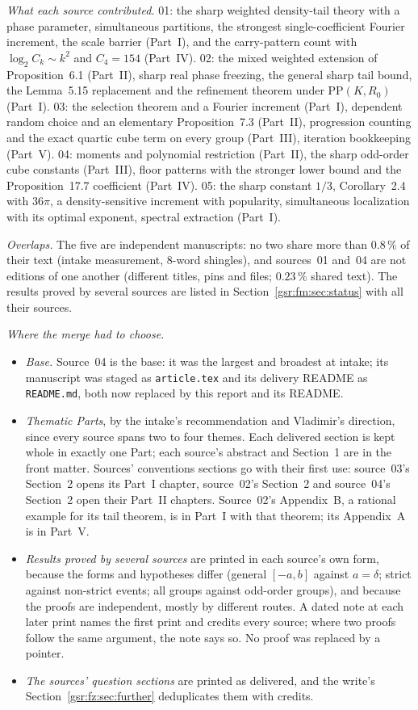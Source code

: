 \documentclass[11pt,letterpaper]{article}
\numberwithin{equation}{section}
\theoremstyle{definition}
\theoremstyle{remark}
\newcommand{\1}{\mathbf 1}
\newcommand{\file}[1]{\nolinkurl{#1}}
\begin{document}
\emph{What each source contributed.} 01: the sharp weighted density-tail theory with a phase parameter, simultaneous partitions, the strongest single-coefficient Fourier increment, the scale barrier (Part~I), and the carry-pattern count with $\log_2C_k\sim k^2$ and $C_4=154$ (Part~IV). 02: the mixed weighted extension of Proposition~6.1 (Part~II), sharp real phase freezing, the general sharp tail bound, the Lemma~5.15 replacement and the refinement theorem under $\mathrm{PP}(K,R_0)$ (Part~I). 03: the selection theorem and a Fourier increment (Part~I), dependent random choice and an elementary Proposition~7.3 (Part~II), progression counting and the exact quartic cube term on every group (Part~III), iteration bookkeeping (Part~V). 04: moments and polynomial restriction (Part~II), the sharp odd-order cube constants (Part~III), floor patterns with the stronger lower bound and the Proposition~17.7 coefficient (Part~IV). 05: the sharp constant $1/3$, Corollary~2.4 with $36\pi$, a density-sensitive increment with popularity, simultaneous localization with its optimal exponent, spectral extraction (Part~I).

\emph{Overlaps.} The five are independent manuscripts: no two share more than $0.8\,\%$ of their text (intake measurement, 8-word shingles), and sources~01 and~04 are not editions of one another (different titles, pins and files; $0.23\,\%$ shared text). The results proved by several sources are listed in Section~\ref{gsr:fm:sec:status} with all their sources.

\emph{Where the merge had to choose.}
\begin{itemize}[nosep]
\item \emph{Base.} Source~04 is the base: it was the largest and broadest at intake; its manuscript was staged as \file{article.tex} and its delivery README as \file{README.md}, both now replaced by this report and its README.
\item \emph{Thematic Parts}, by the intake's recommendation and Vladimir's direction, since every source spans two to four themes. Each delivered section is kept whole in exactly one Part; each source's abstract and Section~1 are in the front matter. Sources' conventions sections go with their first use: source~03's Section~2 opens its Part~I chapter, source~02's Section~2 and source~04's Section~2 open their Part~II chapters. Source~02's Appendix~B, a rational example for its tail theorem, is in Part~I with that theorem; its Appendix~A is in Part~V.
\item \emph{Results proved by several sources} are printed in each source's own form, because the forms and hypotheses differ (general $[-a,b]$ against $a=\delta$; strict against non-strict events; all groups against odd-order groups), and because the proofs are independent, mostly by different routes. A dated note at each later print names the first print and credits every source; where two proofs follow the same argument, the note says so. No proof was replaced by a pointer.
\item \emph{The sources' question sections} are printed as delivered, and the write's Section~\ref{gsr:fz:sec:further} deduplicates them with credits.
\end{itemize}
\end{document}
